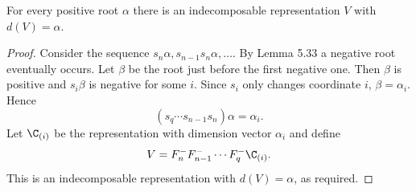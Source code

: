 \begin{corollary}[Corollary 5.37]
For every positive root $\alpha$ there is an indecomposable representation $V$ with $d(V)=\alpha$.
\end{corollary}
\begin{proof}
Consider the sequence $s_n\alpha,s_{n-1}s_n\alpha,\ldots$. By Lemma 5.33 a negative root eventually occurs. Let $\beta$ be the root just before the first negative one. Then $\beta$ is positive and $s_i\beta$ is negative for some $i$. Since $s_i$ only changes coordinate $i$, $\beta=\alpha_i$. Hence
\[
(s_q\cdots s_{n-1}s_n)\alpha=\alpha_i.
\]
Let $\C_{(i)}$ be the representation with dimension vector $\alpha_i$ and define
\[
V=F_n^-F_{n-1}^-\cdots F_q^-\C_{(i)}.
\]
This is an indecomposable representation with $d(V)=\alpha$, as required.
\end{proof}
